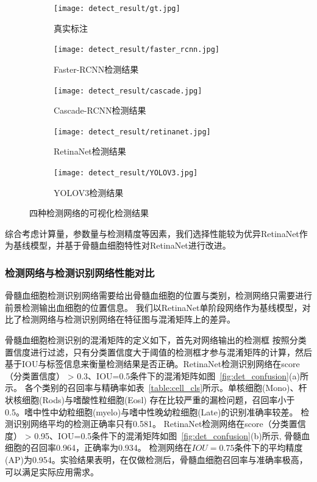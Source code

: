 \begin{figure}[htbp]
	\centering
	\begin{subfigure}{0.9\linewidth}
		\centering
		\texttt{[image: detect\_result/gt.jpg]}
    \caption{真实标注}
	\end{subfigure}
	\centering
	\begin{subfigure}{0.9\linewidth}
		\centering
		\texttt{[image: detect\_result/faster\_rcnn.jpg]}
    \caption{Faster-RCNN检测结果}
	\end{subfigure}
	\centering
	\begin{subfigure}{0.9\linewidth}
		\centering
		\texttt{[image: detect\_result/cascade.jpg]}
    \caption{Cascade-RCNN检测结果}
	\end{subfigure}
	\centering
	\begin{subfigure}{0.9\linewidth}
		\centering
		\texttt{[image: detect\_result/retinanet.jpg]}
    \caption{RetinaNet检测结果}
	\end{subfigure}
	\centering
  \begin{subfigure}{0.9\linewidth}
		\centering
		\texttt{[image: detect\_result/YOLOV3.jpg]}
    \caption{YOLOV3检测结果}
	\end{subfigure}
	\caption{四种检测网络的可视化检测结果}
	\label{fig:detect_result}
\end{figure}

综合考虑计算量，参数量与检测精度等因素，我们选择性能较为优异RetinaNet作为基线模型，并基于骨髓血细胞特性对RetinaNet进行改进。

\subsubsection{检测网络与检测识别网络性能对比}
\label{section:detect}

骨髓血细胞检测识别网络需要给出骨髓血细胞的位置与类别，检测网络只需要进行前景检测输出血细胞的位置信息。
我们以RetinaNet单阶段网络作为基线模型，对比了检测网络与检测识别网络在特征图与混淆矩阵上的差异。

骨髓血细胞检测识别的混淆矩阵的定义如下，首先对网络输出的检测框
按照分类置信度进行过滤，只有分类置信度大于阈值的检测框才参与混淆矩阵的计算，然后
基于IOU与标签信息来衡量检测结果是否正确。RetinaNet检测识别网络在score（分类置信度） > 0.3、IOU=0.5条件下的混淆矩阵如图~\ref{fig:det_confusion}(a)所示。
各个类别的召回率与精确率如表~\ref{table:cell_cls}所示。单核细胞(Mono)、杆状核细胞(Rods)与嗜酸性粒细胞(Eosl)
存在比较严重的漏检问题，召回率小于0.5。嗜中性中幼粒细胞(myelo)与嗜中性晚幼粒细胞(Late)的识别准确率较差。
检测识别网络平均的检测正确率只有0.581。
RetinaNet检测网络在score（分类置信度） > 0.95、IOU=0.5条件下的混淆矩阵如图~\ref{fig:det_confusion}(b)所示, 骨髓血细胞的召回率0.964，正确率为0.934。
检测网络在$IOU=0.75$条件下的平均精度(AP)为0.954。实验结果表明，在仅做检测后，骨髓血细胞召回率与准确率极高，可以满足实际应用需求。

